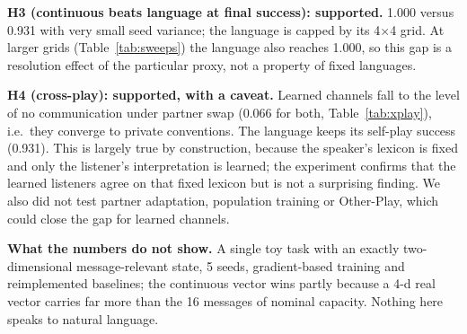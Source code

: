 \textbf{H3 (continuous beats language at final success): supported.} 1.000 versus 0.931 with very small seed variance; the language is capped by its 4$\times$4 grid. At larger grids (Table~\ref{tab:sweeps}) the language also reaches 1.000, so this gap is a resolution effect of the particular proxy, not a property of fixed languages.

\textbf{H4 (cross-play): supported, with a caveat.} Learned channels fall to the level of no communication under partner swap (0.066 for both, Table~\ref{tab:xplay}), i.e.\ they converge to private conventions. The language keeps its self-play success (0.931). This is largely true by construction, because the speaker's lexicon is fixed and only the listener's interpretation is learned; the experiment confirms that the learned listeners agree on that fixed lexicon but is not a surprising finding. We also did not test partner adaptation, population training or Other-Play, which could close the gap for learned channels.

\textbf{What the numbers do not show.} A single toy task with an exactly two-dimensional message-relevant state, 5 seeds, gradient-based training and reimplemented baselines; the continuous vector wins partly because a 4-d real vector carries far more than the 16 messages of nominal capacity. Nothing here speaks to natural language.
